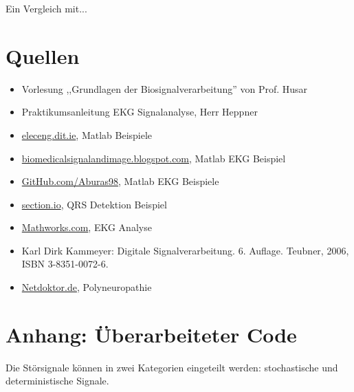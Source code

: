 \documentclass[a4paper,12pt,titlepage]{scrartcl}
\begin{document}
Ein Vergleich mit...


\newpage
\section{Quellen}
\begin{itemize}
    \item Vorlesung ,,Grundlagen der Biosignalverarbeitung'' von Prof. Husar
    \item Praktikumsanleitung EKG Signalanalyse, Herr Heppner
    \item \href{https://eleceng.dit.ie/dorran/matlab/resources/Matlab%20Signal%20Processing%20Examples.pdf}{eleceng.dit.ie}, Matlab Beispiele
    \item \href{https://biomedicalsignalandimage.blogspot.com/2016/02/matlab-code-to-plot-ecg-signal.html}{biomedicalsignalandimage.blogspot.com}, Matlab EKG Beispiel
    \item \href{https://github.com/Aburas98/MATLAB/}{GitHub.com/Aburas98}, Matlab EKG Beispiele
    \item \href{https://www.section.io/engineering-education/electrocardiograms-qrs-peak-and-heart-rate-detection-using-dwt-in-matlab/}{section.io}, QRS Detektion Beispiel
    \item \href{https://de.mathworks.com/help/dsp/ug/real-time-ecg-qrs-detection.html}{Mathworks.com}, EKG Analyse
    \item Karl Dirk Kammeyer: Digitale Signalverarbeitung. 6. Auflage. Teubner, 2006, ISBN 3-8351-0072-6.
    \item \href{https://www.netdoktor.de/krankheiten/polyneuropathie/}{Netdoktor.de}, Polyneuropathie
\end{itemize}

\listoffigures

\newpage
\section{Anhang: Überarbeiteter Code}
Die Störsignale können in zwei Kategorien eingeteilt werden: stochastische und deterministische Signale.
\end{document}
